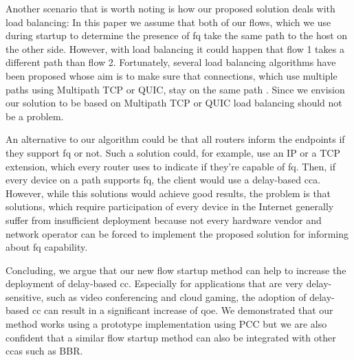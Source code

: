 \documentclass[runningheads]{llncs}
\begin{document}
Another scenario that is worth noting is how our proposed solution deals with load balancing: In this paper we assume that both of our flows, which we use during startup to determine the presence of \gls{fq} take the same path to the host on the other side. However, with load balancing it could happen that flow 1 takes a different path than flow 2. Fortunately, several load balancing algorithms have been proposed whose aim is to make sure that connections, which use multiple paths using Multipath TCP or QUIC, stay on the same path \cite{olivier_bonaventure_multipath_2018,olteanu_datacenter_2016,lienardy_towards_2016}. Since we envision our solution to be based on Multipath TCP or QUIC load balancing should not be a problem. 

An alternative to our algorithm could be that all routers inform the endpoints if they support \gls{fq} or not. Such a solution could, for example, use an IP or a TCP extension, which every router uses to indicate if they're capable of \gls{fq}. Then, if every device on a path supports \gls{fq}, the client would use a delay-based \gls{cca}. However, while this solutions would achieve good results, the problem is that solutions, which require participation of every device in the Internet generally suffer from insufficient deployment because not every hardware vendor and network operator can be forced to implement the proposed solution for informing about \gls{fq} capability. 

Concluding, we argue that our new flow startup method can help to increase the deployment of delay-based \gls{cc}. Especially for applications that are very delay-sensitive, such as video conferencing and cloud gaming, the adoption of delay-based \gls{cc} can result in a significant increase of \gls{qoe}. We demonstrated that our method works using a prototype implementation using PCC but we are also confident that a similar flow startup method can also be integrated with other \glspl{cca} such as BBR. 



\end{document}
